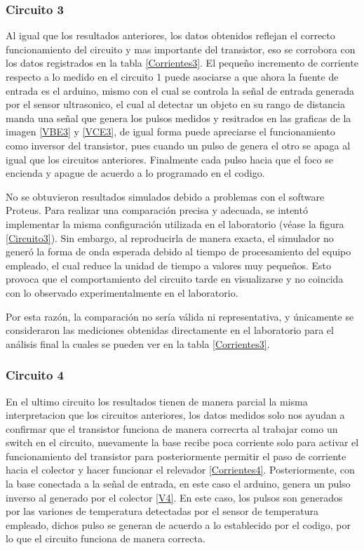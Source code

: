 \subsubsection{Circuito 3}
Al igual que los resultados anteriores, los datos obtenidos reflejan el correcto funcionamiento del circuito y mas importante del transistor, eso se corrobora con los datos registrados en la tabla \ref{Corrientes3}. El pequeño incremento de corriente respecto a lo medido en el circuito 1 puede asociarse a que ahora la fuente de entrada es el arduino, mismo con el cual se controla la señal de entrada generada por el sensor ultrasonico, el cual al detectar un objeto en su rango de distancia manda una señal que genera los pulsos medidos y resitrados en las graficas de la imagen \ref{VBE3} y \ref{VCE3}, de igual forma puede apreciarse el funcionamiento como inversor del transistor, pues cuando un pulso de genera el otro se apaga al igual que los circuitos anteriores. Finalmente cada pulso hacia que el foco se encienda y apague de acuerdo a lo programado en el codigo.


No se obtuvieron resultados simulados debido a problemas con el software Proteus. Para realizar una comparación precisa y adecuada, se intentó implementar la misma configuración utilizada en el laboratorio (véase la figura \ref{Circuito3}). Sin embargo, al reproducirla de manera exacta, el simulador no generó la forma de onda esperada debido al tiempo de procesamiento del equipo empleado, el cual reduce la unidad de tiempo a valores muy pequeños. Esto provoca que el comportamiento del circuito tarde en visualizarse y no coincida con lo observado experimentalmente en el laboratorio.

Por esta razón, la comparación no sería válida ni representativa, y únicamente se consideraron las mediciones obtenidas directamente en el laboratorio para el análisis final la cuales se pueden ver en la tabla \ref{Corrientes3}.



\subsubsection{Circuito 4}
En el ultimo circuito los resultados tienen de manera parcial la misma interpretacion que los circuitos anteriores, los datos medidos solo nos ayudan a confirmar que el transistor funciona de manera correcrta al trabajar como un switch en el circuito, nuevamente la base recibe poca corriente solo para activar el funcionamiento del transistor para posteriormente permitir el paso de corriente hacia el colector y hacer funcionar el relevador \ref{Corrientes4}. Posteriormente, con la base conectada a la señal de entrada, en este caso el arduino, genera un pulso inverso al generado por el colector \ref{V4}. En este caso, los pulsos son generados por las variones de temperatura detectadas por el sensor de temperatura empleado, dichos pulso se generan de acuerdo a lo establecido por el codigo, por lo que el circuito funciona de manera correcta. 

